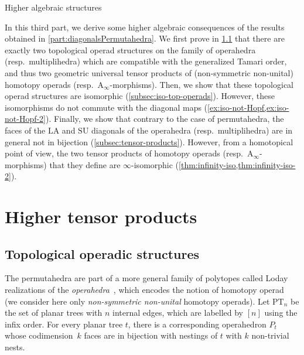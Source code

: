 \documentclass{amsart}
\makeatletter
\theoremstyle{definition}
\newcommand{\PT}{\mathrm{PT}} %
\newcommand{\resp}{resp.~} %
\newcommand{\SU}{\mathrm{SU}}
\newcommand{\LA}{\mathrm{LA}}
\newcommand{\Ainf}{\ensuremath{\mathrm{A}_\infty}}
\def\part{\@startsection{part}{1}%
\z@{.7\linespacing\@plus\linespacing}{.8\linespacing}%
{\LARGE\sffamily\centering}}
\makeatother
\begin{document}

\clearpage

\part{Higher algebraic structures}
\label{part:higherAlgebraicStructures}

In this third part, we derive some higher algebraic consequences of the results obtained in \cref{part:diagonalsPermutahedra}.
We first prove in \cref{subsec:top-operadic-structures} that there are exactly two topological operad structures on the family of operahedra (\resp multiplihedra) which are compatible with the generalized Tamari order, and thus two geometric universal tensor products of (non-symmetric non-unital) homotopy operads (\resp $\Ainf$-morphisms).
Then, we show that these topological operad structures are isomorphic (\cref{subsec:iso-top-operads}).
However, these isomorphisms do not commute with the diagonal maps (\cref{ex:iso-not-Hopf,ex:iso-not-Hopf-2}).
Finally, we show that contrary to the case of permutahedra, the faces of the $\LA$ and $\SU$ diagonals of the operahedra (\resp multiplihedra) are in general not in bijection (\cref{subsec:tensor-products}).
However, from a homotopical point of view, the two tensor products of homotopy operads (\resp $\Ainf$-morphisms) that they define are $\infty$-isomorphic (\cref{thm:infinity-iso,thm:infinity-iso-2}). 


\section{Higher tensor products}


\subsection{Topological operadic structures}
\label{subsec:top-operadic-structures}

The permutahedra are part of a more general family of polytopes called Loday realizations of the \emph{operahedra}~\cite[Def.~2.9]{LaplanteAnfossi}, which encodes the notion of homotopy operad~\cite[Def.~4.11]{LaplanteAnfossi} (we consider here only \emph{non-symmetric non-unital} homotopy operads).
Let $\PT_n$ be the set of planar trees with $n$ internal edges, which are labelled by $[n]$ using the infix order.
For every planar tree $t$, there is a corresponding operahedron $P_t$ whose codimension~$k$ faces are in bijection with nestings of $t$ with $k$ non-trivial nests.
\end{document}
